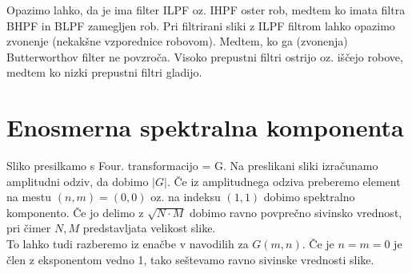 \documentclass[12pt,a4paper]{article}
\begin{document}
Opazimo lahko, da je ima filter ILPF oz. IHPF oster rob, medtem ko imata filtra BHPF in BLPF zamegljen rob. Pri filtrirani sliki z ILPF filtrom lahko opazimo zvonenje (nekakšne vzporednice robovom). Medtem, ko ga (zvonenja) Butterworthov filter ne povzroča. 
Visoko prepustni filtri ostrijo oz. iščejo robove, medtem ko nizki prepustni filtri gladijo. 
\section{Enosmerna spektralna komponenta}
Sliko presilkamo s Four. transformacijo = G. Na preslikani sliki izračunamo amplitudni odziv, da dobimo $\lvert G \rvert$. Če iz amplitudnega odziva preberemo element na mestu $(n,m) =(0,0)$ oz. na indeksu $(1,1)$ dobimo spektralno komponento. Če jo delimo z $\sqrt{N\cdot M}$ dobimo ravno povprečno sivinsko vrednost, pri čimer $N, M$ predstavljata velikost slike.\\
To lahko tudi razberemo iz enačbe v navodilih za $G(m, n)$. Če je $n= m = 0$ je člen z eksponentom vedno 1, tako seštevamo ravno sivinske vrednosti slike. 
\end{document}
